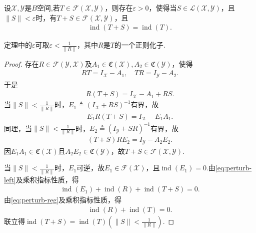 \documentclass[../../main.tex]{subfiles}%
\begin{document}
\begin{theorem}\label{theorem:泛函分析--定理3.6.7}
设$\mathscr{X},\mathscr{Y}$是$B$空间,若$T\in\mathscr{F}(\mathscr{X},\mathscr{Y})$，则存在$\varepsilon>0$，使得当$S\in\mathscr{L}(\mathscr{X},\mathscr{Y})$，且$\|S\|<\varepsilon$时，有$T+S\in\mathscr{F}(\mathscr{X},\mathscr{Y})$，且
\begin{align*}
\operatorname{ind}(T+S)=\operatorname{ind}(T).
\end{align*}
\end{theorem}
\begin{remark}
定理中的$\varepsilon$可取$\varepsilon<\frac{1}{\|R\|}$，其中$R$是$T$的一个正则化子.
\end{remark}
\begin{proof}

存在$R\in\mathscr{F}(\mathscr{Y},\mathscr{X})$及$A_1\in\mathfrak{C}(\mathscr{X}),A_2\in\mathfrak{C}(\mathscr{Y})$，使得
\begin{align}
RT=I_{\mathscr{X}}-A_1,\quad TR=I_{\mathscr{Y}}-A_2.\label{eq:perturb-reg}
\end{align}
于是
\begin{align*}
R(T+S)=I_{\mathscr{X}}-A_1+RS.
\end{align*}
当$\|S\|<\frac{1}{\|R\|}$时，$E_1\triangleq(I_{\mathscr{X}}+RS)^{-1}$有界，故
\begin{align}
E_1R(T+S)=I_{\mathscr{X}}-E_1A_1.\label{eq:perturb-left}
\end{align}
同理，当$\|S\|<\frac{1}{\|R\|}$时，$E_2\triangleq(I_{\mathscr{Y}}+SR)^{-1}$有界，故
\begin{align}
(T+S)RE_2=I_{\mathscr{Y}}-A_2E_2.\label{eq:perturb-right}
\end{align}
因$E_1A_1\in\mathfrak{C}(\mathscr{X})$且$A_2E_2\in\mathfrak{C}(\mathscr{Y})$，故$T+S\in\mathscr{F}(\mathscr{X},\mathscr{Y})$.

当$\|S\|<\frac{1}{\|R\|}$时，$E_1$可逆，故$E_1\in\mathscr{F}(\mathscr{X})$，且$\operatorname{ind}(E_1)=0$.由\eqref{eq:perturb-left}及乘积指标性质，得
\begin{align*}
\operatorname{ind}(E_1)+\operatorname{ind}(R)+\operatorname{ind}(T+S)=0.
\end{align*}
由\eqref{eq:perturb-reg}及乘积指标性质，得
\begin{align*}
\operatorname{ind}(R)+\operatorname{ind}(T)=0.
\end{align*}
联立得$\operatorname{ind}(T+S)=\operatorname{ind}(T)\left(\|S\|<\frac{1}{\|R\|}\right)$.

\end{proof}
\end{document}
